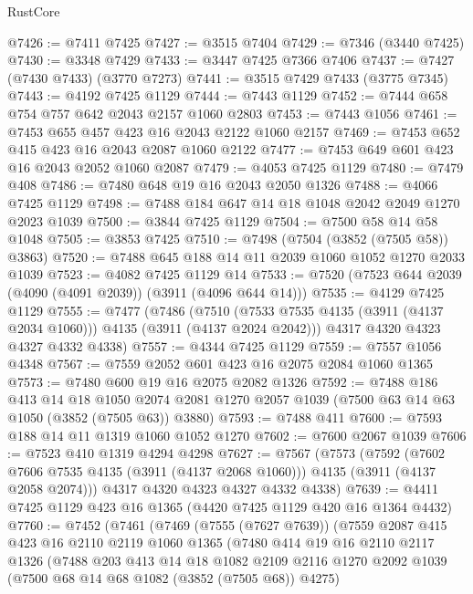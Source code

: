 \begin{lexlean}{RustCore}
\begin{coremodule}
@7426 := @7411 @7425
@7427 := @3515 @7404
@7429 := @7346 (@3440 @7425)
@7430 := @3348 @7429
@7433 := @3447 @7425 @7366 @7406
@7437 := @7427 (@7430 @7433) (@3770 @7273)
@7441 := @3515 @7429 @7433 (@3775 @7345)
@7443 := @4192 @7425 @1129
@7444 := @7443 @1129
@7452 := @7444 @658 @754 @757 @642 @2043 @2157 @1060 @2803
@7453 := @7443 @1056
@7461 := @7453 @655 @457 @423 @16 @2043 @2122 @1060 @2157
@7469 := @7453 @652 @415 @423 @16 @2043 @2087 @1060 @2122
@7477 := @7453 @649 @601 @423 @16 @2043 @2052 @1060 @2087
@7479 := @4053 @7425 @1129
@7480 := @7479 @408
@7486 := @7480 @648 @19 @16 @2043 @2050 @1326
@7488 := @4066 @7425 @1129
@7498 := @7488 @184 @647 @14 @18 @1048 @2042 @2049 @1270 @2023 @1039
@7500 := @3844 @7425 @1129
@7504 := @7500 @58 @14 @58 @1048
@7505 := @3853 @7425
@7510 := @7498 (@7504 (@3852 (@7505 @58)) @3863)
@7520 := @7488 @645 @188 @14 @11 @2039 @1060 @1052 @1270 @2033 @1039
@7523 := @4082 @7425 @1129 @14
@7533 := @7520 (@7523 @644 @2039 (@4090 (@4091 @2039)) (@3911 (@4096 @644 @14)))
@7535 := @4129 @7425 @1129
@7555 := @7477
    (@7486
      (@7510 (@7533 @7535 @4135 (@3911 (@4137 @2034 @1060))) @4135 (@3911 (@4137 @2024 @2042)))
      @4317
      @4320
      @4323
      @4327
      @4332
      @4338)
@7557 := @4344 @7425 @1129
@7559 := @7557 @1056 @4348
@7567 := @7559 @2052 @601 @423 @16 @2075 @2084 @1060 @1365
@7573 := @7480 @600 @19 @16 @2075 @2082 @1326
@7592 := @7488
    @186
    @413
    @14
    @18
    @1050
    @2074
    @2081
    @1270
    @2057
    @1039
    (@7500 @63 @14 @63 @1050 (@3852 (@7505 @63)) @3880)
@7593 := @7488 @411
@7600 := @7593 @188 @14 @11 @1319 @1060 @1052 @1270
@7602 := @7600 @2067 @1039
@7606 := @7523 @410 @1319 @4294 @4298
@7627 := @7567
    (@7573
      (@7592
        (@7602 @7606 @7535 @4135 (@3911 (@4137 @2068 @1060)))
        @4135
        (@3911 (@4137 @2058 @2074)))
      @4317
      @4320
      @4323
      @4327
      @4332
      @4338)
@7639 := @4411 @7425 @1129 @423 @16 @1365 (@4420 @7425 @1129 @420 @16 @1364 @4432)
@7760 := @7452
    (@7461
      (@7469
        (@7555 (@7627 @7639))
        (@7559
          @2087
          @415
          @423
          @16
          @2110
          @2119
          @1060
          @1365
          (@7480
            @414
            @19
            @16
            @2110
            @2117
            @1326
            (@7488
              @203
              @413
              @14
              @18
              @1082
              @2109
              @2116
              @1270
              @2092
              @1039
              (@7500 @68 @14 @68 @1082 (@3852 (@7505 @68)) @4275)

\end{coremodule}
\end{lexlean}
